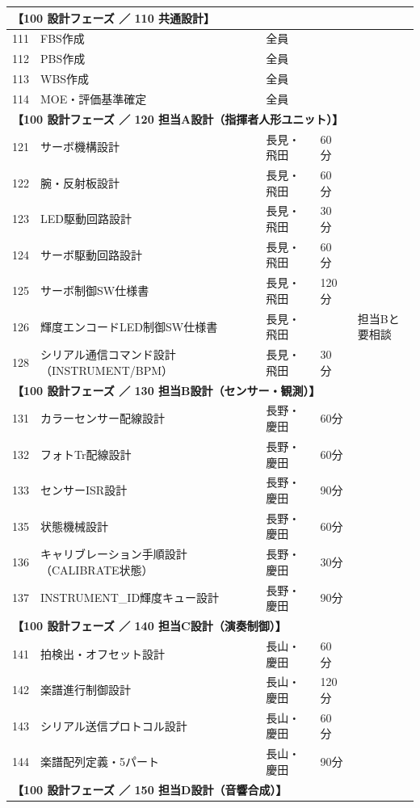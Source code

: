 \begin{longtable}{p{0.9cm}p{7cm}p{2.5cm}p{2cm}p{2cm}}
\multicolumn{5}{l}{\textbf{【100 設計フェーズ ／ 110 共通設計】}} \\
\midrule
111 & FBS作成 & 全員 &  &  \\
112 & PBS作成 & 全員 &  &  \\
113 & WBS作成 & 全員 &  &  \\
114 & MOE・評価基準確定 & 全員 &  &  \\
\midrule
\multicolumn{5}{l}{\textbf{【100 設計フェーズ ／ 120 担当A設計（指揮者人形ユニット）】}} \\
\midrule
121 & サーボ機構設計 & 長見・飛田 & 60 分 &  \\
122 & 腕・反射板設計 & 長見・飛田 & 60 分 &  \\
123 & LED駆動回路設計 & 長見・飛田 & 30 分 &  \\
124 & サーボ駆動回路設計 & 長見・飛田 & 60 分 &  \\
125 & サーボ制御SW仕様書 & 長見・飛田 & 120 分 &  \\
126 & 輝度エンコードLED制御SW仕様書 & 長見・飛田 &  & 担当Bと要相談 \\
128 & シリアル通信コマンド設計（INSTRUMENT/BPM） & 長見・飛田 & 30 分 &  \\
\midrule
\multicolumn{5}{l}{\textbf{【100 設計フェーズ ／ 130 担当B設計（センサー・観測）】}} \\
\midrule
131 & カラーセンサー配線設計 & 長野・慶田 & 60分 &  \\
132 & フォトTr配線設計 & 長野・慶田 & 60分 &  \\
133 & センサーISR設計 & 長野・慶田 & 90分 &  \\
135 & 状態機械設計 & 長野・慶田 & 60分 &  \\
136 & キャリブレーション手順設計（CALIBRATE状態） & 長野・慶田 & 30分 &  \\
137 & INSTRUMENT\_ID輝度キュー設計 & 長野・慶田 & 90分 &  \\
\midrule
\multicolumn{5}{l}{\textbf{【100 設計フェーズ ／ 140 担当C設計（演奏制御）】}} \\
\midrule
141 & 拍検出・オフセット設計 & 長山・慶田 & 60 分 &  \\
142 & 楽譜進行制御設計 & 長山・慶田 & 120 分 &  \\
143 & シリアル送信プロトコル設計 & 長山・慶田 & 60 分 &  \\
144 & 楽譜配列定義・5パート & 長山・慶田 & 90分 &  \\
\midrule
\multicolumn{5}{l}{\textbf{【100 設計フェーズ ／ 150 担当D設計（音響合成）】}} \\

\end{longtable}
